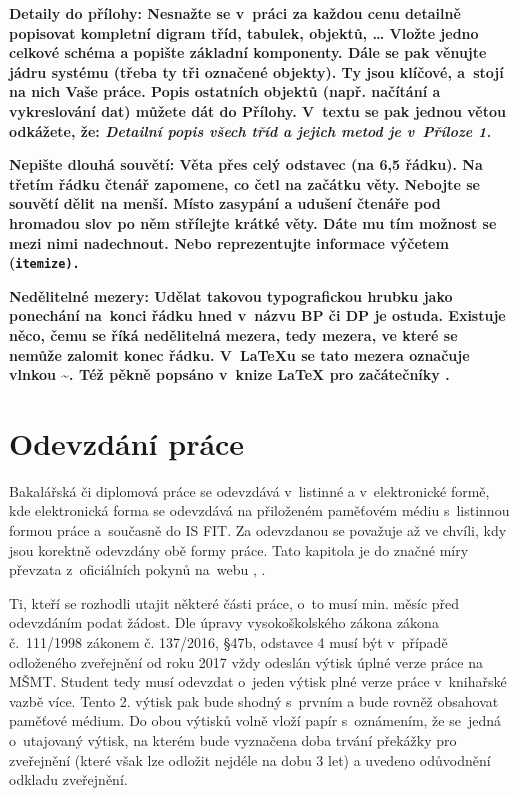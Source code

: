 \bf Detaily do přílohy: \rm Nesnažte se v~práci za každou cenu detailně popisovat kompletní digram tříd, tabulek, objektů, \ldots{} Vložte jedno celkové schéma a popište základní komponenty. Dále se pak věnujte jádru systému (třeba ty tři označené objekty). Ty jsou klíčové, a~stojí na nich Vaše práce. Popis ostatních  objektů (např. načítání a vykreslování dat) můžete dát do Přílohy. V~textu se pak jednou větou odkážete, že: \it Detailní popis všech tříd a jejich metod je v~Příloze 1. \rm

\bf Nepište dlouhá souvětí: \rm Věta přes celý odstavec (na 6,5 řádku). Na třetím řádku čtenář zapomene, co četl na začátku věty. Nebojte se souvětí dělit na menší. Místo zasypání a udušení čtenáře pod hromadou slov po něm střílejte krátké věty. Dáte mu tím možnost se mezi nimi nadechnout. Nebo reprezentujte informace výčetem (\tt itemize\rm ). 

\bf Nedělitelné mezery: \rm Udělat takovou typografickou hrubku jako ponechání  na~konci řádku hned v~názvu BP či DP je ostuda. Existuje něco, čemu se říká nedělitelná mezera, tedy mezera, ve které se nemůže zalomit konec řádku. V~\LaTeX{}u se tato mezera označuje vlnkou \textasciitilde. Též pěkně popsáno v~knize {\LaTeX} pro začátečníky \cite{Rybicka}.

\chapter{Odevzdání práce} 
\label{odevzdani}

Bakalářská či diplomová práce se odevzdává v~listinné a v~elektronické formě, kde elektronická forma se odevzdává na přiloženém paměťovém médiu s~listinnou formou práce a~současně do IS FIT. Za odevzdanou se považuje až ve chvíli, kdy jsou korektně odevzdány obě formy práce. Tato kapitola je do značné míry převzata z~oficiálních pokynů na~webu \cite{formalniBP}, \cite{formalniDP}.

Ti, kteří se rozhodli utajit některé části práce, o~to musí min. měsíc před odevzdáním podat žádost. Dle úpravy vysokoškolského zákona zákona č.~111/1998 zákonem č. 137/2016, \S 47b, odstavce 4 musí být v~případě odloženého zveřejnění od roku 2017 vždy odeslán výtisk úplné verze práce na MŠMT. Student tedy musí odevzdat o~jeden výtisk plné verze práce v~knihařské vazbě více. Tento 2. výtisk pak bude shodný s~prvním a bude rovněž obsahovat paměťové médium. Do obou výtisků volně vloží papír s~oznámením, že se~jedná o~utajovaný výtisk, na kterém bude vyznačena doba trvání překážky pro zveřejnění (které však lze odložit nejdéle na dobu 3 let) a uvedeno odůvodnění odkladu zveřejnění. 

